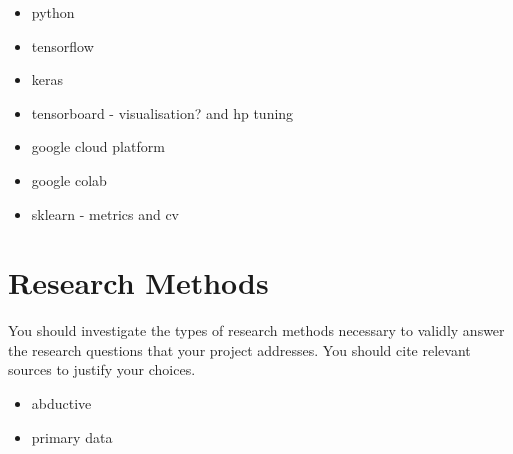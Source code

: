 \begin{itemize}
    \item python
    \item tensorflow
    \item keras
    \item tensorboard - visualisation? and hp tuning
    \item google cloud platform
    \item google colab
    \item sklearn - metrics and cv
\end{itemize}

\section{Research Methods}
You should investigate the types of research methods necessary to validly answer the research questions that your project addresses. You should cite relevant sources to justify your choices.
\begin{itemize}
    \item abductive
    \item primary data
    
\end{itemize}